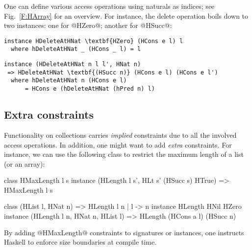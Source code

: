 \documentclass[nocopyrightspace,preprint]{sigplan-proc}
\begin{document}
One can define various access operations using naturals as indices;
see Fig.~\ref{F:HArray} for an overview. For instance, the delete
operation boils down to two instances: one for @HZero@; another for
@HSucc@:

\begin{Verbatim}[commandchars=\\\{\}]
 instance HDeleteAtHNat \textbf{HZero} (HCons e l) l
  where hDeleteAtHNat _ (HCons _ l) = l
\end{Verbatim}

\begin{Verbatim}[commandchars=\\\{\}]
 instance (HDeleteAtHNat n l l', HNat n)
 => HDeleteAtHNat \textbf{(HSucc n)} (HCons e l) (HCons e l')
  where hDeleteAtHNat n (HCons e l)
      = HCons e (hDeleteAtHNat (hPred n) l)
\end{Verbatim}


\medskip

\subsection*{Extra constraints}

Functionality on collections carries \emph{implied} constraints due to
all the involved access operations.  In addition, one might want to
add \emph{extra} constraints. For instance, we can use the
following class to restrict the maximum length of a list (or an
array):

\begin{code}
 class HMaxLength l s
 instance (HLength l s', HLt s' (HSucc s) HTrue)
       =>  HMaxLength l s 
\end{code}

\begin{code}
 class (HList l, HNat n) => HLength l n | l -> n
 instance HLength HNil HZero
 instance (HLength l n, HNat n, HList l)
       =>  HLength (HCons a l) (HSucc n)
\end{code}

By adding @HMaxLength@ constraints to signatures or instances, one
instructs Haskell to enforce size boundaries at compile time.



\end{document}
